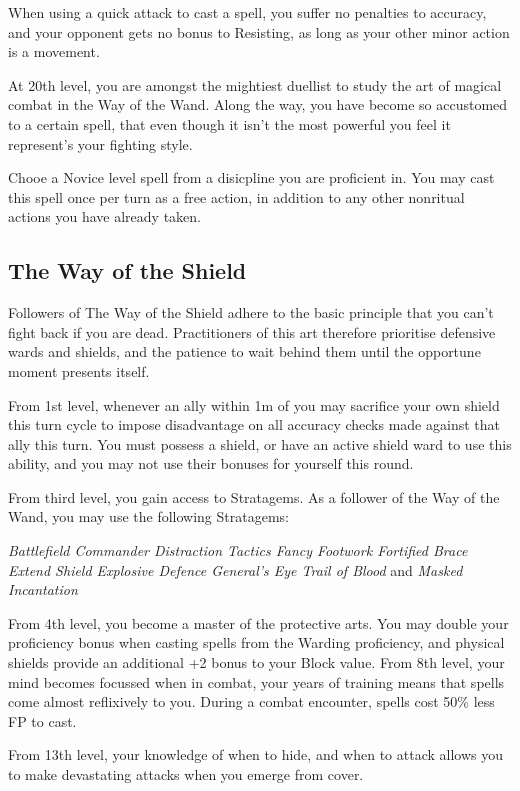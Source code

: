 {{	When using a quick attack to cast a spell, you suffer no penalties to accuracy, and your opponent gets no bonus to Resisting, as long as your other minor action is a movement. 
}
{
At 20th level, you are amongst the mightiest duellist to study the art of magical combat in the Way of the Wand. Along the way, you have become so accustomed to a certain spell, that \minus{} even though it isn't the most powerful \minus{} you feel it represent's your fighting style.  

Chooe a Novice level spell from a disicpline you are proficient in. You may cast this spell once per turn as a free action, in addition to any other non\minus{}ritual actions you have already taken.
}

\subsection{\bf The Way of the Shield}

Followers of The Way of the Shield adhere to the basic principle that you can't fight back if you are dead. Practitioners of this art therefore prioritise defensive wards and shields, and the patience to wait behind them until the opportune moment presents itself. 


From 1st level, whenever an ally within 1m of you may sacrifice your own shield this turn cycle to impose disadvantage on all accuracy checks made against that ally this turn. You must possess a shield, or have an active shield ward to use this ability, and you may not use their bonuses for yourself this round. 



From third level, you gain access to Stratagems. As a follower of the Way of the Wand, you may use the following Stratagems:

{\it 
Battlefield Commander\comma{} Distraction Tactics\comma{} Fancy Footwork\comma{} Fortified Brace\comma{} Extend Shield\comma{} Explosive Defence\comma{} General’s Eye\comma{} Trail of Blood } and {\it Masked Incantation
}

{
	From 4th level, you become a master of the protective arts. 	You may double your proficiency bonus when casting spells from the Warding proficiency, and physical shields provide an additional +2 bonus to your Block value. 
}
{
	From 8th level, your mind becomes focussed when in combat, your years of training means that spells come almost reflixively to you. During a combat encounter, spells cost 50\% less FP to cast. 
}
{
	From 13th level, your knowledge of when to hide, and when to attack allows you to make devastating attacks when you emerge from cover.  
	
}}
